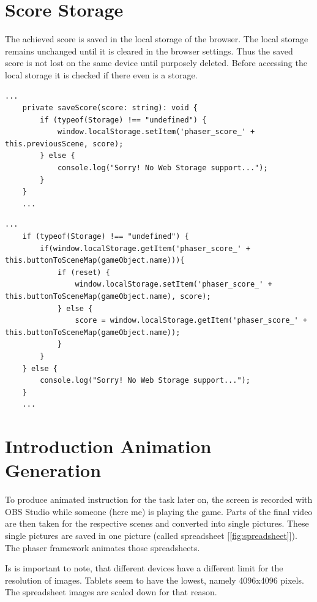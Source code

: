 \section{Score Storage}\label{sec:scorestorage}
The achieved score is saved in the local storage of the browser.
The local storage remains unchanged until it is cleared in the browser settings.
Thus the saved score is not lost on the same device until purposely deleted.
Before accessing the local storage it is checked if there even is a storage.

\begin{lstlisting}[style=TypeScript, caption={Storage access (scoreScene.ts)}]
    ...
    private saveScore(score: string): void {
        if (typeof(Storage) !== "undefined") {
            window.localStorage.setItem('phaser_score_' + this.previousScene, score);
        } else {
            console.log("Sorry! No Web Storage support...");
        }
    }
    ...
\end{lstlisting}

\begin{lstlisting}[style=TypeScript, caption={Storage access (levelMenuScene.ts)}]
    ...
    if (typeof(Storage) !== "undefined") {
        if(window.localStorage.getItem('phaser_score_' + this.buttonToSceneMap(gameObject.name))){
            if (reset) {
                window.localStorage.setItem('phaser_score_' + this.buttonToSceneMap(gameObject.name), score);
            } else {
                score = window.localStorage.getItem('phaser_score_' + this.buttonToSceneMap(gameObject.name));
            }
        }
    } else {
        console.log("Sorry! No Web Storage support...");
    }
    ...
\end{lstlisting}

\section{Introduction Animation Generation}\label{sec:introduction-animation-generation}
To produce animated instruction for the task later on,
the screen is recorded with OBS Studio while someone (here me) is playing the game.
Parts of the final video are then taken for the respective scenes and converted into single pictures.
These single pictures are saved in one picture (called spreadsheet [\ref{fig:spreadsheet}]).
The phaser framework animates those spreadsheets.

Is is important to note, that different devices have a different limit for the resolution of images.
Tablets seem to have the lowest, namely 4096x4096 pixels.
The spreadsheet images are scaled down for that reason.

